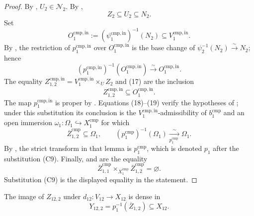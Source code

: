 \begin{proof}
  By ,
  $U_2\in\mathscr N_2$.  By ,
  \[
    Z_2\subseteq U_2\subseteq N_2.                                \tag{17}
  \]
  Set
  \[
    O_1^{\mathrm{cmp,in}}
      :=(\psi_1^{\mathrm{cmp,in}})^{-1}(N_2)
      \subseteq V_1^{\mathrm{cmp,in}}.
  \]
  By
  , the restriction of
  $p_1^{\mathrm{cmp,in}}$ over $O_1^{\mathrm{cmp,in}}$ is the base change of
  $\psi_2^{-1}(N_2)\xrightarrow{\sim}N_2$; hence
  \[
    (p_1^{\mathrm{cmp,in}})^{-1}(O_1^{\mathrm{cmp,in}})
      \xrightarrow{\sim}O_1^{\mathrm{cmp,in}}.                    \tag{18}
  \]
  The equality
  $Z_{1,2}^{\mathrm{cmp,in}}=V_1^{\mathrm{cmp,in}}\times_UZ_2$
  and (17) are the inclusion
  \[
    Z_{1,2}^{\mathrm{cmp,in}}\subseteq O_1^{\mathrm{cmp,in}}.     \tag{19}
  \]
  The map $p_1^{\mathrm{cmp,in}}$ is proper by
  .  Equations (18)--(19)
  verify the hypotheses of
  ; under this substitution its
  conclusion is the $V_1^{\mathrm{cmp,in}}$-admissibility of
  $b_1^{\mathrm{cmp}}$ and an open immersion
  $\omega_1\colon\Omega_1\hookrightarrow X_1^{\mathrm{cmp}}$ for which
  \[
    \overline Z_{1,2}^{\mathrm{cmp}}\subseteq\Omega_1,
    \qquad
    (p_1^{\mathrm{cmp}})^{-1}(\Omega_1)
      \xrightarrow[ p_1^{\mathrm{cmp}}\ ]{\sim}\Omega_1.        \tag{19a}
  \]
  By , the strict transform
  in that lemma is $p_1^{\mathrm{cmp}}$, which is denoted $p_1$ after the
  substitution (C9).  Finally,
   and
   are the equality
  \[
    \overline Z_{1,1}^{\mathrm{cmp}}
      \times_{X_1^{\mathrm{cmp}}}
    \overline Z_{1,2}^{\mathrm{cmp}}=\varnothing.
  \]
  Substitution (C9) is the displayed equality in the statement.
\end{proof}

\begin{lemma}
  \label{lemma:nagata-comparison-boundary-density}

  The image of $Z_{12,2}$ under $d_{12}\colon V_{12}\to X_{12}$ is dense in
  \[
    Y_{12,2}=p_1^{-1}(\overline Z_{1,2})\subseteq X_{12}.
  \]
\end{lemma}


